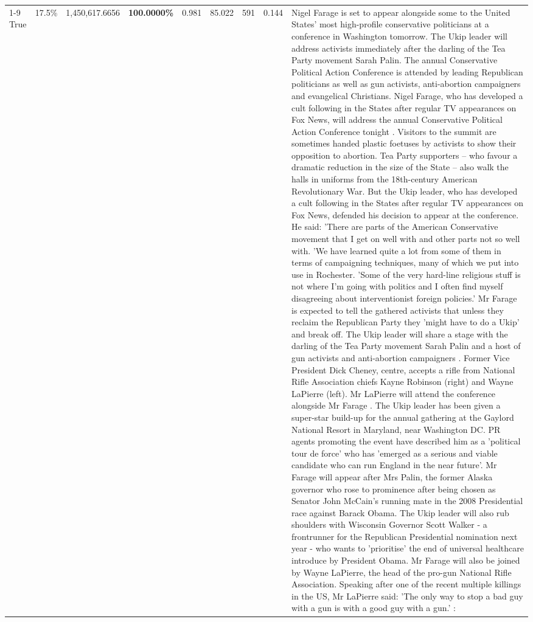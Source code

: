 \begin{table}[H]
\begin{tabular}{lllrlllll}
\cline{1-9} \cline{2-9}
True & 17.5\% & 1,450,617.6656 & \bfseries \color{red} 100.0000\% & 0.981 & 85.022 & 591 & 0.144 & Nigel Farage is set to appear alongside some to the United States' most high-profile conservative politicians at a conference in Washington tomorrow. The Ukip leader will address activists immediately after the darling of the Tea Party movement Sarah Palin. The annual Conservative Political Action Conference is attended by leading Republican politicians as well as gun activists, anti-abortion campaigners and evangelical Christians. Nigel Farage, who has developed a cult following in the States after regular TV appearances on Fox News, will address the annual Conservative Political Action Conference tonight . Visitors to the summit are sometimes handed plastic foetuses by activists to show their opposition to abortion. Tea Party supporters – who favour a dramatic reduction in the size of the State – also walk the halls in uniforms from the 18th-century American Revolutionary War. But the Ukip leader, who has developed a cult following in the States after regular TV appearances on Fox News, defended his decision to appear at the conference. He said: 'There are parts of the American Conservative movement that I get on well with and other parts not so well with. 'We have learned quite a lot from some of them in terms of campaigning techniques, many of which we put into use in Rochester. 'Some of the very hard-line religious stuff is not where I'm going with politics and I often find myself disagreeing about interventionist foreign policies.' Mr Farage is expected to tell the gathered activists that unless they reclaim the Republican Party they 'might have to do a Ukip' and break off. The Ukip leader will share a stage with the darling of the Tea Party movement Sarah Palin and a host of gun activists and anti-abortion campaigners . Former Vice President Dick Cheney, centre, accepts a rifle from National Rifle Association chiefs Kayne Robinson (right) and Wayne LaPierre (left). Mr LaPierre will attend the conference alongside Mr Farage . The Ukip leader has been given a super-star build-up for the annual gathering at the Gaylord National Resort in Maryland, near Washington DC. PR agents promoting the event have described him as a 'political tour de force' who has 'emerged as a serious and viable candidate who can run England in the near future'. Mr Farage will appear after Mrs Palin, the former Alaska governor who rose to prominence after being chosen as Senator John McCain's running mate in the 2008 Presidential race against Barack Obama. The Ukip leader will also rub shoulders with Wisconsin Governor Scott Walker - a frontrunner for the Republican Presidential nomination next year - who wants to 'prioritise' the end of universal healthcare introduce by President Obama. Mr Farage will also be joined by Wayne LaPierre, the head of the pro-gun National Rifle Association. Speaking after one of the recent multiple killings in the US, Mr LaPierre said: 'The only way to stop a bad guy with a gun is with a good guy with a gun.' : \\

\end{tabular}
\end{table}
